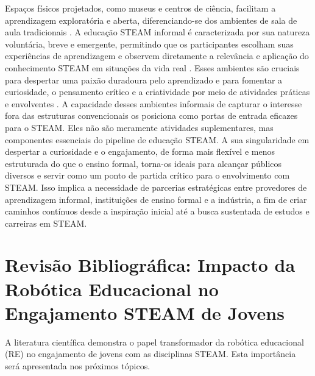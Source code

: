 \documentclass[%
  12pt,%
  a4paper,%
  oneside,%
  openright,%
  sumario = abnt-6027-2012,%
  chapter = TITLE,%
  pretextualoneside,%
  fontetimes,%
  semrecuonosumario,%
  usemakeindex,%
  pardeassinaturas,%
  english,%
  french,%
  spanish,%
  brazil,%
]{utfpr}%
\begin{document}
Espaços físicos projetados, como museus e centros de ciência, facilitam a aprendizagem exploratória e aberta, diferenciando-se dos ambientes de sala de aula tradicionais \cite{ross2024BeyondExhibits}. A educação STEAM informal é caracterizada por sua natureza voluntária, breve e emergente, permitindo que os participantes escolham suas experiências de aprendizagem e observem diretamente a relevância e aplicação do conhecimento STEAM em situações da vida real \cite{cheung2024SummerLibraries}. Esses ambientes são cruciais para despertar uma paixão duradoura pelo aprendizado e para fomentar a curiosidade, o pensamento crítico e a criatividade por meio de atividades práticas e envolventes \cite{meegleYouthRobotics2025}.
A capacidade desses ambientes informais de capturar o interesse fora das estruturas convencionais os posiciona como portas de entrada eficazes para o STEAM. Eles não são meramente atividades suplementares, mas componentes essenciais do pipeline de educação STEAM. A sua singularidade em despertar a curiosidade e o engajamento, de forma mais flexível e menos estruturada do que o ensino formal, torna-os ideais para alcançar públicos diversos e servir como um ponto de partida crítico para o envolvimento com STEAM. Isso implica a necessidade de parcerias estratégicas entre provedores de aprendizagem informal, instituições de ensino formal e a indústria, a fim de criar caminhos contínuos desde a inspiração inicial até a busca sustentada de estudos e carreiras em STEAM.




\chapter{Revisão Bibliográfica: Impacto da Robótica Educacional no Engajamento STEAM de Jovens}
A literatura científica demonstra o papel transformador da robótica educacional (RE) no engajamento de jovens com as disciplinas STEAM. Esta importância será apresentada nos próximos tópicos.
\end{document}
